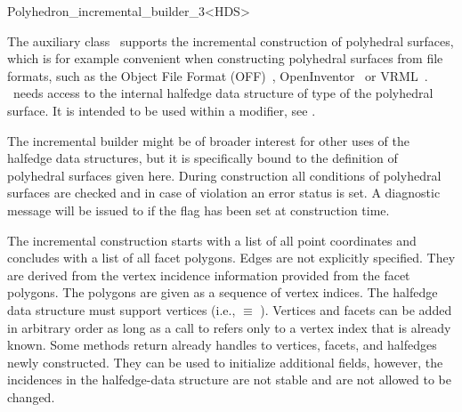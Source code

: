 
\ccRefPageBegin



\begin{ccRefClass}{Polyhedron_incremental_builder_3<HDS>}
\label{pagePolyIncrBuilder}

\ccDefinition
{}
  
The auxiliary class \ccClassTemplateName\ supports the incremental
construction of polyhedral surfaces, which is for example convenient
when constructing polyhedral surfaces from file formats, such as the
Object File Format (OFF)~\cite{cgal:p-gmgv16-96},
OpenInventor~\cite{cgal:w-impoo-94} or 
VRML~\cite{cgal:bpp-vrml-95,cgal:vrmls-96}.
\ccClassTemplateName\ needs access to the internal halfedge data
structure of type  of the polyhedral surface. It is intended
to be used within a modifier, see .

The incremental builder might be of broader interest for other uses of
the halfedge data structures, but it is specifically bound to the
definition of polyhedral surfaces given here. During construction all
conditions of polyhedral surfaces are checked and in case of violation
an error status is set. A diagnostic message will be issued to
 if the  flag has been set at construction
time.

The incremental construction starts with a list of all point
coordinates and concludes with a list of all facet polygons. Edges are
not explicitly specified. They are derived from the vertex incidence
information provided from the facet polygons. The polygons are given as a
sequence of vertex indices.  The halfedge data structure  must
support vertices (i.e.,  $\equiv$
). Vertices and facets can be added in arbitrary order
as long as a call to  refers only to a
vertex index that is already known. Some methods return already
handles to vertices, facets, and halfedges newly constructed. They can
be used to initialize additional fields, however, the incidences in
the halfedge-data structure are not stable and are not allowed to be
changed.


\end{ccRefClass}
